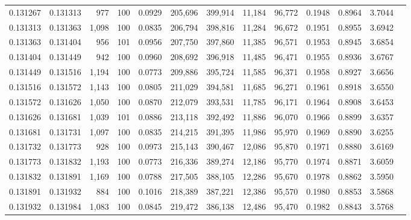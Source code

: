 \begin{tabular}{rrrrrrrrrrrrr}
0.131267 & 0.131313 &   977 & 100 &                                     0.0929 & 205,696 & 399,914 &  11,184 &  96,772 & 0.1948 & 0.8964 & 3.7044 \\
0.131313 & 0.131363 & 1,098 & 100 &                                     0.0835 & 206,794 & 398,816 &  11,284 &  96,672 & 0.1951 & 0.8955 & 3.6942 \\
0.131363 & 0.131404 &   956 & 101 &                                     0.0956 & 207,750 & 397,860 &  11,385 &  96,571 & 0.1953 & 0.8945 & 3.6854 \\
0.131404 & 0.131449 &   942 & 100 &                                     0.0960 & 208,692 & 396,918 &  11,485 &  96,471 & 0.1955 & 0.8936 & 3.6767 \\
0.131449 & 0.131516 & 1,194 & 100 &                                     0.0773 & 209,886 & 395,724 &  11,585 &  96,371 & 0.1958 & 0.8927 & 3.6656 \\
0.131516 & 0.131572 & 1,143 & 100 &                                     0.0805 & 211,029 & 394,581 &  11,685 &  96,271 & 0.1961 & 0.8918 & 3.6550 \\
0.131572 & 0.131626 & 1,050 & 100 &                                     0.0870 & 212,079 & 393,531 &  11,785 &  96,171 & 0.1964 & 0.8908 & 3.6453 \\
0.131626 & 0.131681 & 1,039 & 101 &                                     0.0886 & 213,118 & 392,492 &  11,886 &  96,070 & 0.1966 & 0.8899 & 3.6357 \\
0.131681 & 0.131731 & 1,097 & 100 &                                     0.0835 & 214,215 & 391,395 &  11,986 &  95,970 & 0.1969 & 0.8890 & 3.6255 \\
0.131732 & 0.131773 &   928 & 100 &                                     0.0973 & 215,143 & 390,467 &  12,086 &  95,870 & 0.1971 & 0.8880 & 3.6169 \\
0.131773 & 0.131832 & 1,193 & 100 &                                     0.0773 & 216,336 & 389,274 &  12,186 &  95,770 & 0.1974 & 0.8871 & 3.6059 \\
0.131832 & 0.131891 & 1,169 & 100 &                                     0.0788 & 217,505 & 388,105 &  12,286 &  95,670 & 0.1978 & 0.8862 & 3.5950 \\
0.131891 & 0.131932 &   884 & 100 &                                     0.1016 & 218,389 & 387,221 &  12,386 &  95,570 & 0.1980 & 0.8853 & 3.5868 \\
0.131932 & 0.131984 & 1,083 & 100 &                                     0.0845 & 219,472 & 386,138 &  12,486 &  95,470 & 0.1982 & 0.8843 & 3.5768 \\

\end{tabular}
